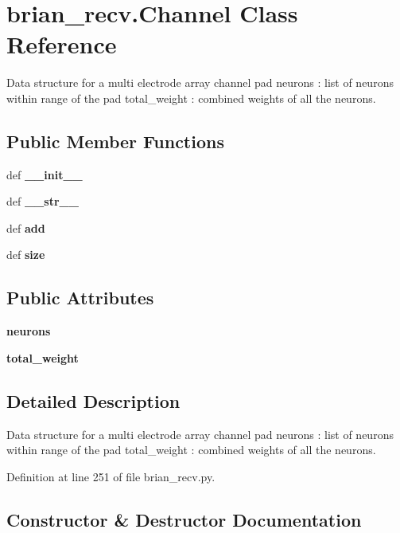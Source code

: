\section{brian\-\_\-recv.\-Channel \-Class \-Reference}
\label{classbrian__recv_1_1Channel}


\-Data structure for a multi electrode array channel pad neurons \-: list of neurons within range of the pad total\-\_\-weight \-: combined weights of all the neurons.  


\subsection*{\-Public \-Member \-Functions}
\begin{DoxyCompactItemize}
\item 
def {\bf \-\_\-\-\_\-init\-\_\-\-\_\-}
\item 
def {\bf \-\_\-\-\_\-str\-\_\-\-\_\-}
\item 
def {\bf add}
\item 
def {\bf size}
\end{DoxyCompactItemize}
\subsection*{\-Public \-Attributes}
\begin{DoxyCompactItemize}
\item 
{\bf neurons}
\item 
{\bf total\-\_\-weight}
\end{DoxyCompactItemize}


\subsection{\-Detailed \-Description}
\-Data structure for a multi electrode array channel pad neurons \-: list of neurons within range of the pad total\-\_\-weight \-: combined weights of all the neurons. 

\-Definition at line 251 of file brian\-\_\-recv.\-py.



\subsection{\-Constructor \& \-Destructor \-Documentation}
